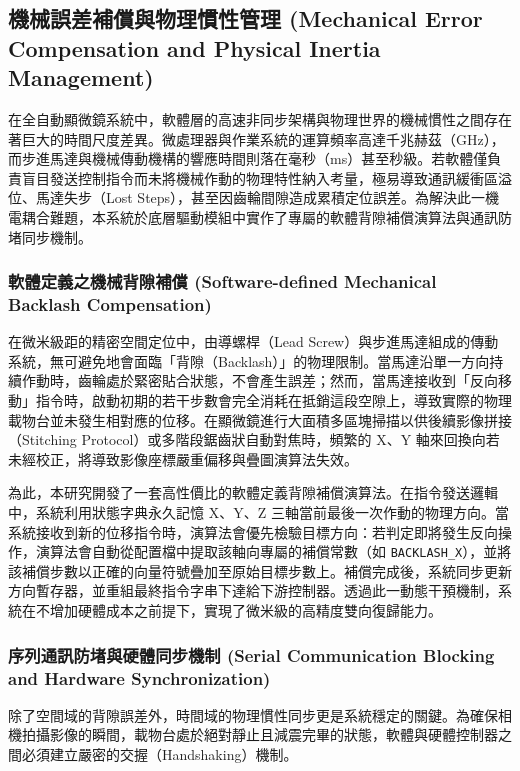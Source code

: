 \subsection{機械誤差補償與物理慣性管理 (Mechanical Error Compensation and Physical Inertia Management)}

在全自動顯微鏡系統中，軟體層的高速非同步架構與物理世界的機械慣性之間存在著巨大的時間尺度差異。微處理器與作業系統的運算頻率高達千兆赫茲（GHz），而步進馬達與機械傳動機構的響應時間則落在毫秒（ms）甚至秒級。若軟體僅負責盲目發送控制指令而未將機械作動的物理特性納入考量，極易導致通訊緩衝區溢位、馬達失步（Lost Steps），甚至因齒輪間隙造成累積定位誤差。為解決此一機電耦合難題，本系統於底層驅動模組中實作了專屬的軟體背隙補償演算法與通訊防堵同步機制。

\subsubsection{軟體定義之機械背隙補償 (Software-defined Mechanical Backlash Compensation)}

在微米級距的精密空間定位中，由導螺桿（Lead Screw）與步進馬達組成的傳動系統，無可避免地會面臨「背隙（Backlash）」的物理限制。當馬達沿單一方向持續作動時，齒輪處於緊密貼合狀態，不會產生誤差；然而，當馬達接收到「反向移動」指令時，啟動初期的若干步數會完全消耗在抵銷這段空隙上，導致實際的物理載物台並未發生相對應的位移。在顯微鏡進行大面積多區塊掃描以供後續影像拼接（Stitching Protocol）或多階段鋸齒狀自動對焦時，頻繁的 X、Y 軸來回換向若未經校正，將導致影像座標嚴重偏移與疊圖演算法失效。

為此，本研究開發了一套高性價比的軟體定義背隙補償演算法。在指令發送邏輯中，系統利用狀態字典永久記憶 X、Y、Z 三軸當前最後一次作動的物理方向。當系統接收到新的位移指令時，演算法會優先檢驗目標方向：若判定即將發生反向操作，演算法會自動從配置檔中提取該軸向專屬的補償常數（如 \texttt{BACKLASH\_X}），並將該補償步數以正確的向量符號疊加至原始目標步數上。補償完成後，系統同步更新方向暫存器，並重組最終指令字串下達給下游控制器。透過此一動態干預機制，系統在不增加硬體成本之前提下，實現了微米級的高精度雙向復歸能力。

\subsubsection{序列通訊防堵與硬體同步機制 (Serial Communication Blocking and Hardware Synchronization)}

除了空間域的背隙誤差外，時間域的物理慣性同步更是系統穩定的關鍵。為確保相機拍攝影像的瞬間，載物台處於絕對靜止且減震完畢的狀態，軟體與硬體控制器之間必須建立嚴密的交握（Handshaking）機制。

